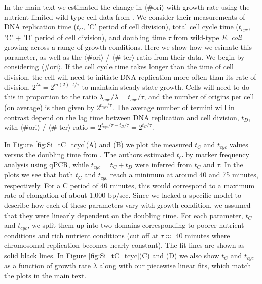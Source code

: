 In the main text we estimated the change in $\langle$\#ori$\rangle$ with growth
rate using the nutrient-limited wild-type cell data from \cite{si2017}. We
consider their measurements of DNA replication time ($t_{C}$, 'C' period of
cell division), total cell cycle time ($t_{cyc}$, 'C' + 'D' period of cell
division), and doubling time $\tau$ from wild-type \textit{E. coli} growing
across a range of growth conditions. Here we show how we  esimate this
parameter, as well as the $\langle$\#ori$\rangle$ / $\langle$\# ter$\rangle$
ratio from their data.  We begin by considering $\langle$\#ori$\rangle$. If the
cell cycle time takes longer  than the time of cell division, the cell will need
to initiate DNA replication  more often than its rate of division, $2^{\lambda
t} = 2^{ln(2) \cdot t/ \tau}$ to maintain steady state growth. Cells will need
to do this in proportion to the ratio $\lambda_{cyc} / \lambda =  t_{cyc}/\tau$,
and the number of origins per cell (on average) is then given by $2^{t_{cyc}/
\tau}$.   The average number of termini will in contrast depend on the lag time
between  DNA replication and cell division, $t_{D}$, with
$\langle$\#ori$\rangle$ / $\langle$\# ter$\rangle$ ratio = $2^{t_{cyc}/ \tau -
t_{D}/ \tau} =  2^{t_{C}/ \tau}$.

In Figure \ref{fig:Si_tC_tcyc}(A) and (B) we plot the measured $t_{C}$ and $t_{cyc}$
values versus the doubling time from \cite{si2017}. The authors estimated
$t_{C}$ by marker frequency analysis using qPCR, while  $t_{cyc} = t_{C} +
t_{D}$ were inferred from $t_{C}$ and $\tau$. In the plots we see that both
$t_{C}$ and $t_{cyc}$ reach a minimum  at around 40 and 75 minutes,
respectively. For a C period of 40 minutes, this would correspond to a maximum
rate of elongation of about 1,000 bp/sec. Since we lacked a specific model to
describe how each of these parameters vary with growth condition, we assumed
that they were linearly dependent on the doubling time. For each parameter,
$t_{C}$ and $t_{cyc}$, we split them up into two domains corresponding to poorer
nutrient conditions and rich nutrient conditions (cut off at $\tau \approx$ 40
minutes where chromosomal replication becomes nearly constant). The fit lines
are shown as solid black lines. In Figure \ref{fig:Si_tC_tcyc}(C) and (D) we also
show $t_{C}$ and $t_{cyc}$ as a function of growth rate $\lambda$ along with our
piecewise linear fits, which match the plots in the main text.


